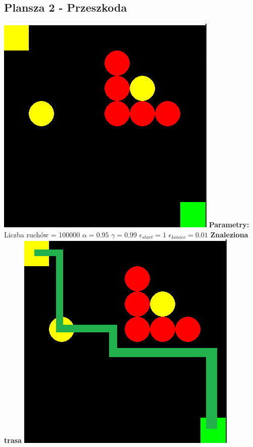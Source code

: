 \documentclass[a4paper,12pt]{article}
\begin{document}
\subsection{Plansza 2 - Przeszkoda}
\includegraphics[scale=0.73]{testy/plansza2.png} \newline
\textbf{Parametry:}
Liczba ruchów = 100000
\newline \(\alpha = 0.95\)
\newline \(\gamma = 0.99\)
\newline \(\epsilon_{start} = 1\)
\newline \(\epsilon_{koniec} = 0.01\) \newline \newline
\textbf{\Large{Znaleziona trasa}} \newline \newline
\includegraphics[scale=0.73]{testy/plansza2trasa.png} \newline \newline
\end{document}
